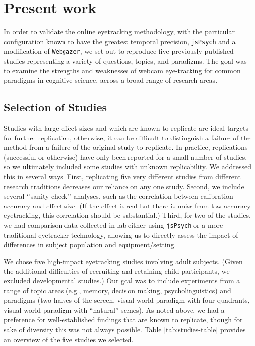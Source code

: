 \documentclass[
  man,floatsintext]{apa6}
\begin{document}
\hypertarget{present-work}{%
\section{Present work}\label{present-work}}

In order to validate the online eyetracking methodology, with the particular configuration known to have the greatest temporal precision, \texttt{jsPsych} and a modification of \texttt{Webgazer}, we set out to reproduce five previously published studies representing a variety of questions, topics, and paradigms. The goal was to examine the strengths and weaknesses of webcam eye-tracking for common paradigms in cognitive science, across a broad range of research areas.

\hypertarget{selection-of-studies}{%
\subsection{Selection of Studies}\label{selection-of-studies}}

Studies with large effect sizes and which are known to replicate are ideal targets for further replication; otherwise, it can be difficult to distinguish a failure of the method from a failure of the original study to replicate. In practice, replications (successful or otherwise) have only been reported for a small number of studies, so we ultimately included some studies with unknown replicability. We addressed this in several ways. First, replicating five very different studies from different research traditions decreases our reliance on any one study. Second, we include several `'sanity check'' analyses, such as the correlation between calibration accuracy and effect size. (If the effect is real but there is noise from low-accuracy eyetracking, this correlation should be substantial.) Third, for two of the studies, we had comparison data collected in-lab either using \texttt{jsPsych} or a more traditional eyetracker technology, allowing us to directly assess the impact of differences in subject population and equipment/setting.

We chose five high-impact eyetracking studies involving adult subjects. (Given the additional difficulties of recruiting and retaining child participants, we excluded developmental studies.) Our goal was to include experiments from a range of topic areas (e.g., memory, decision making, psycholinguistics) and paradigms (two halves of the screen, visual world paradigm with four quadrants, visual world paradigm with ``natural'' scenes). As noted above, we had a preference for well-established findings that are known to replicate, though for sake of diversity this was not always possible. Table \ref{tab:studies-table} provides an overview of the five studies we selected.
\end{document}
